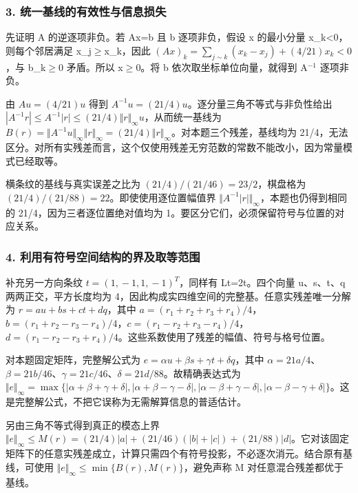 \documentclass[UTF8,a4paper,11pt]{ctexart}
\begin{document}
\subsubsection*{3. 统一基线的有效性与信息损失}

先证明 A 的逆逐项非负。若 Ax=b 且 b 逐项非负，假设 x 的最小分量 x\_k<0，则每个邻居满足 x\_j\ensuremath{\ge }x\_k，因此 \((Ax)_k=\sum_{j\sim k}(x_k-x_j)+(4/21)x_k<0\)，与 b\_k\ensuremath{\ge }0 矛盾。所以 x\ensuremath{\ge }0。将 b 依次取坐标单位向量，就得到 A\ensuremath{{}^{-1}} 逐项非负。

由 \(Au=(4/21)u\) 得到 \(A^{-1}u=(21/4)u\)。逐分量三角不等式与非负性给出 \(|A^{-1}r|\le A^{-1}|r|\le (21/4)\Vert r\Vert_{\infty}u\)，从而统一基线为 \(B(r)=\Vert A^{-1}u\Vert_{\infty}\Vert r\Vert_{\infty}=(21/4)\Vert r\Vert_{\infty}\)。对本题三个残差，基线均为 21/4，无法区分。对所有实残差而言，这个仅使用残差无穷范数的常数不能改小，因为常量模式已经取等。

横条纹的基线与真实误差之比为 \((21/4)/(21/46)=23/2\)，棋盘格为 \((21/4)/(21/88)=22\)。即使使用逐位置幅值界 \(\Vert A^{-1}|r|\Vert_{\infty}\)，本题也仍得到相同的 21/4，因为三者逐位置绝对值均为 1。要区分它们，必须保留符号与位置的对应关系。

\subsubsection*{4. 利用有符号空间结构的界及取等范围}

补充另一方向条纹 \(t=(1,\allowbreak{}-1,\allowbreak{}1,\allowbreak{}-1)^T\)，同样有 Lt=2t。四个向量 u、s、t、q 两两正交，平方长度均为 4，因此构成实四维空间的完整基。任意实残差唯一分解为 \(r=a u+b s+c t+d q\)，其中 \(a=(r_1+r_2+r_3+r_4)/4\)，\(b=(r_1+r_2-r_3-r_4)/4\)，\(c=(r_1-r_2+r_3-r_4)/4\)，\(d=(r_1-r_2-r_3+r_4)/4\)。这些系数使用了残差的幅值、符号与格号位置。

对本题固定矩阵，完整解公式为 \(e=\alpha u+\beta s+\gamma t+\delta q\)，其中 \(\alpha =21a/4\)、\(\beta =21b/46\)、\(\gamma =21c/46\)、\(\delta =21d/88\)。故精确表达式为 \(\Vert e\Vert_{\infty}=\max\{|\alpha +\beta +\gamma +\delta |,\allowbreak{}|\alpha +\beta -\gamma -\delta |,\allowbreak{}|\alpha -\beta +\gamma -\delta |,\allowbreak{}|\alpha -\beta -\gamma +\delta |\}\)。这是完整解公式，不把它误称为无需解算信息的普适估计。

另由三角不等式得到真正的模态上界 \(\Vert e\Vert_{\infty}\le M(r)=(21/4)|a|+(21/46)(|b|+|c|)+(21/88)|d|\)。它对该固定矩阵下的任意实残差成立，计算只需四个有符号投影，不必逐次消元。结合原有基线，可使用 \(\Vert e\Vert_{\infty}\le \min\{B(r),\allowbreak{}M(r)\}\)，避免声称 M 对任意混合残差都优于基线。
\end{document}
